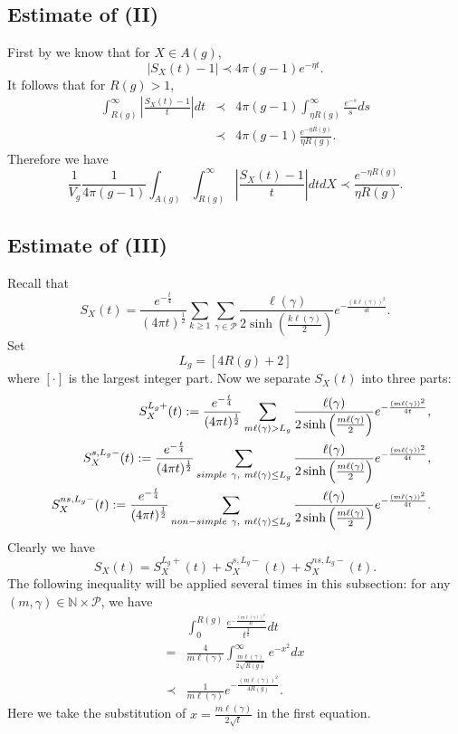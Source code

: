 \documentclass[11pt]{amsart}
\theoremstyle{plain}
\newcommand{\be}{\begin{equation}}
\newcommand{\ene}{\end{equation}}
\newcommand{\bear}{\begin{eqnarray}}
\newcommand{\eear}{\end{eqnarray}}
\newcommand{\beqar}{\begin{eqnarray*}}
\newcommand{\eeqar}{\end{eqnarray*}}
\theoremstyle{definition}
\theoremstyle{remark}
\begin{document}
\subsection{Estimate of (\rm{II})} 
First by  \cite[Lemma 3.3]{naud2023determinants} we know that for $X\in A(g)$, $$|S_X(t)-1|\prec 4\pi(g-1)e^{-\eta t}.$$
It follows that for $R(g)>1$, 
\beqar
\int_{R(g)}^\infty \left|\frac{S_X(t)-1}{t}\right|dt&\prec& 4\pi(g-1)\int_{\eta R(g)}^\infty\frac{e^{-s}}{s}ds\\
&\prec& 4\pi(g-1)\frac{e^{-\eta R(g)}}{\eta R(g)}.
\eeqar
Therefore we have  
\begin{equation}\label{bound-(c)}
\frac{1}{V_g}\frac{1}{4\pi(g-1)}\int_{A(g)}\int_{R(g)}^\infty \left|\frac{S_X(t)-1}{t}\right|dtdX\prec  \frac{e^{-\eta R(g)}}{\eta R(g)}.
\end{equation}


\subsection{Estimate of (\rm{III})}
 Recall that
\[S_X(t)=\frac{e^{-\frac{t}{4}}}{(4\pi t)^\frac{1}{2}}\sum_{k\geq 1}\sum_{\gamma\in \mathcal{P}} \frac{\ell(\gamma)}{2\sinh\left(\frac{k\ell(\gamma)}{2}\right)}e^{-\frac{(k\ell(\gamma))^2}{4t}}.\]
Set $$L_g=[4 R(g)+2]$$ where $[\cdot]$ is the largest integer part. Now we separate $S_X(t)$ into three parts:
\bear
&&S_X^{L_g+}(t):=\frac{e^{-\frac{t}{4}}}{(4\pi t)^\frac{1}{2}}\sum_{m\ell(\gamma)>L_g} \frac{\ell(\gamma)}{2\sinh\left(\frac{m\ell(\gamma)}{2}\right)}e^{-\frac{(m\ell(\gamma))^2}{4t}},\\
&&S_X^{s,L_g-}(t):=\frac{e^{-\frac{t}{4}}}{(4\pi t)^\frac{1}{2}}\sum_{\emph{simple} \ \gamma, \ m\ell(\gamma)\leq L_g} \frac{\ell(\gamma)}{2\sinh\left(\frac{m\ell(\gamma)}{2}\right)}e^{-\frac{(m\ell(\gamma))^2}{4t}},\\
&&S_X^{ns,L_g-}(t):=\frac{e^{-\frac{t}{4}}}{(4\pi t)^\frac{1}{2}}\sum_{\emph{non-simple} \ \gamma, \ m\ell(\gamma)\leq L_g} \frac{\ell(\gamma)}{2\sinh\left(\frac{m\ell(\gamma)}{2}\right)}e^{-\frac{(m\ell(\gamma))^2}{4t}}.
\eear
Clearly we have
\be\label{s-s-x}
S_X(t)=S_X^{L_g+}(t)+S_X^{s,L_g-}(t)+S_X^{ns,L_g-}(t).
\ene
The following inequality will be applied several times in this subsection: for any $(m,\gamma)\in \mathbb{N}\times\mathcal{P}$, we have\be\label{deal-single-0-R(g)}
\begin{aligned}
    &\int_0^{R(g)}\frac{e^{-\frac{(m\ell(\gamma))^2}{4t}}}{t^{\frac{3}{2}}}dt\\
=&\frac{4}{m\ell(\gamma)}\int_{\frac{m\ell(\gamma)}{2\sqrt{R(g)}}}^\infty e^{-x^2}dx\\
\prec&\frac{1}{m\ell(\gamma)}e^{-\frac{(m\ell(\gamma))^2}{4R(g)}}.
\end{aligned}
\ene
Here we take the substitution of $x=\frac{m\ell(\gamma)}{2\sqrt{t}}$ in the first equation.
\end{document}
